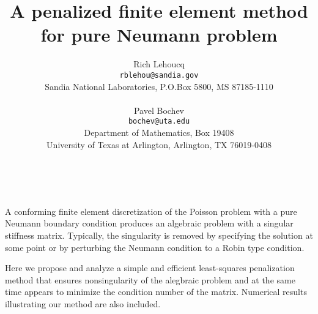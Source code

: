 \documentclass[11pt]{article}
\date{ ~ \hspace{-4mm}}
\title{A penalized finite element method for pure Neumann problem  }
\author{Rich Lehoucq \\ {\tt rblehou@sandia.gov} \\ Sandia National Laboratories, P.O.Box 5800, MS 87185-1110  \\ \\  Pavel Bochev \\ {\tt bochev@uta.edu} \\ Department of Mathematics, Box 19408 \\ University of Texas at Arlington, Arlington, TX 76019-0408}
\begin{document}
\maketitle
\thispagestyle{empty}





 



A conforming finite element discretization of the Poisson problem with
a pure Neumann boundary condition produces an algebraic problem with a
singular stiffness matrix. Typically, the singularity is removed by
specifying the solution at some point or by perturbing the Neumann
condition to a Robin type condition.

Here we propose and analyze a simple and efficient
least-squares penalization method that ensures nonsingularity of the
alegbraic problem and at the same time appears to minimize the
condition number of the matrix. Numerical results illustrating our
method are also included.
\end{document}
